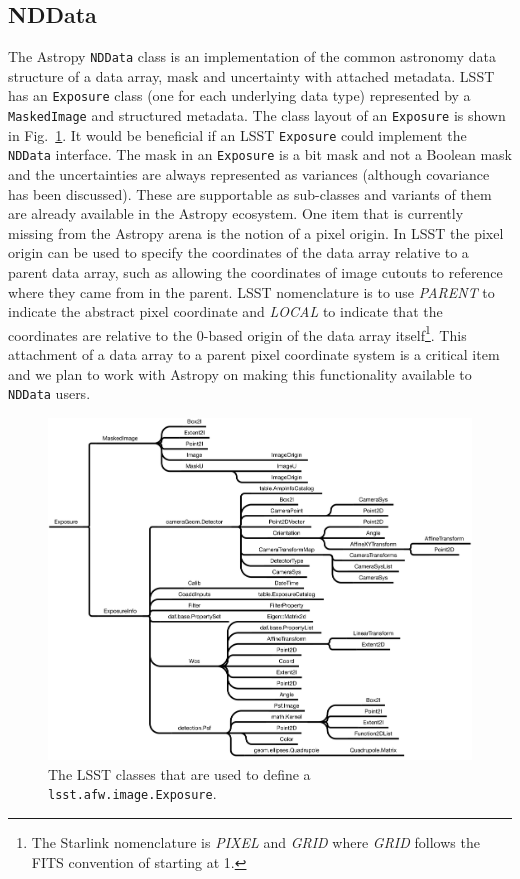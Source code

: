 \documentclass[]{spie}  %
\begin{document}
\subsection{NDData}

The Astropy \texttt{NDData} class is an implementation of the common astronomy data structure\cite{2015A&C....12..146J} of a data array, mask and uncertainty with attached metadata.
LSST has an \texttt{Exposure} class (one for each underlying data type) represented by a \texttt{MaskedImage} and structured metadata.
The class layout of an \texttt{Exposure} is shown in Fig.~\ref{fig:exposure}.
It would be beneficial if an LSST \texttt{Exposure} could implement the \texttt{NDData} interface.
The mask in an \texttt{Exposure} is a bit mask and not a Boolean mask and the uncertainties are always represented as variances (although covariance has been discussed).
These are supportable as sub-classes and variants of them are already available in the Astropy ecosystem.
One item that is currently missing from the Astropy arena is the notion of a pixel origin.
In LSST the pixel origin can be used to specify the coordinates of the data array relative to a parent data array, such as allowing the coordinates of image cutouts to reference where they came from in the parent.
LSST nomenclature is to use \emph{PARENT} to indicate the abstract pixel coordinate and \emph{LOCAL} to indicate that the coordinates are relative to the 0-based origin of the data array itself\footnote{The Starlink nomenclature\cite{2015A&C....12..146J} is \emph{PIXEL} and \emph{GRID} where \emph{GRID} follows the FITS convention of starting at 1.}.
This attachment of a data array to a parent pixel coordinate system is a critical item and we plan to work with Astropy on making this functionality available to \texttt{NDData} users.

\begin{figure} [t]
\begin{center}
\includegraphics[width=\textwidth]{exposure-dependencies}
\end{center}
\caption[layers]
{\label{fig:exposure}
The LSST classes that are used to define a \texttt{lsst.afw.image.Exposure}.}
\end{figure}
\end{document}
